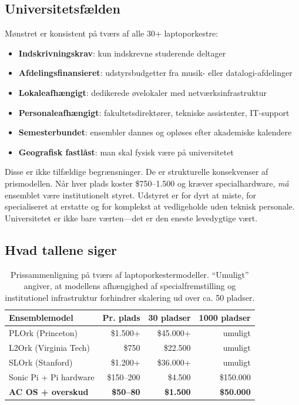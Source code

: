 \documentclass[10pt,letterpaper,twocolumn]{article}
\begin{document}
\subsection{Universitetsf{\ae}lden}

M{\o}nstret er konsistent p{\aa} tv{\ae}rs af alle 30+ laptoporkestre:

\begin{itemize}
  \item \textbf{Indskrivningskrav}: kun indskrevne studerende deltager
  \item \textbf{Afdelingsfinansieret}: udstyrsbudgetter fra musik- eller datalogi-afdelinger
  \item \textbf{Lokaleafh{\ae}ngigt}: dedikerede {\o}velokaler med netv{\ae}rksinfrastruktur
  \item \textbf{Personaleafh{\ae}ngigt}: fakultetsdirekt{\o}rer, tekniske assistenter, IT-support
  \item \textbf{Semesterbundet}: ensembler dannes og opl{\o}ses efter akademiske kalendere
  \item \textbf{Geografisk fastl{\aa}st}: man skal fysisk v{\ae}re p{\aa} universitetet
\end{itemize}

Disse er ikke tilf{\ae}ldige begr{\ae}nsninger. De er strukturelle konsekvenser af prismodellen. N{\aa}r hver plads koster \$750--1.500 og kr{\ae}ver specialhardware, \emph{m{\aa}} ensemblet v{\ae}re institutionelt styret. Udstyret er for dyrt at miste, for specialiseret at erstatte og for komplekst at vedligeholde uden teknisk personale. Universitetet er ikke bare v{\ae}rten---det er den eneste levedygtige v{\ae}rt.

\subsection{Hvad tallene siger}

\begin{table}[h]
\small
\centering
\begin{tabular}{lrrr}
\toprule
\textbf{Ensemblemodel} & \textbf{Pr. plads} & \textbf{30 pladser} & \textbf{1000 pladser} \\
\midrule
PLOrk (Princeton)       & \$1.500+ & \$45.000+ & umuligt \\
L2Ork (Virginia Tech)   & \$750      & \$22.500  & umuligt \\
SLOrk (Stanford)        & \$1.200+ & \$36.000+ & umuligt \\
Sonic Pi + Pi hardware   & \$150--200 & \$4.500   & \$150.000 \\
\textbf{AC OS + overskud} & \textbf{\$50--80} & \textbf{\$1.500} & \textbf{\$50.000} \\
\bottomrule
\end{tabular}
\caption{Prissammenligning p{\aa} tv{\ae}rs af laptoporkestermodeller. ``Umuligt'' angiver, at modellens afh{\ae}ngighed af specialfremstilling og institutionel infrastruktur forhindrer skalering ud over ca. 50 pladser.}
\label{tab:cost}
\end{table}
\end{document}
